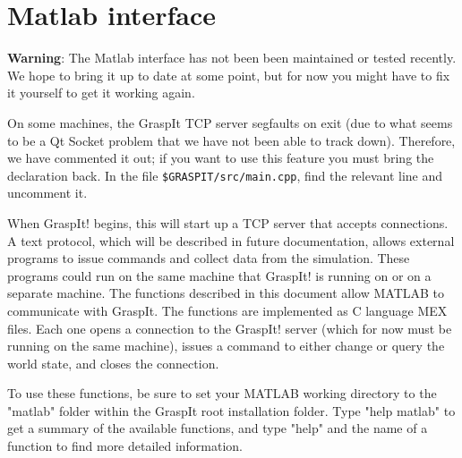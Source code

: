 \section{Matlab interface}

\textbf{Warning}: The Matlab interface has not been been maintained or
tested recently. We hope to bring it up to date at some point, but for
now you might have to fix it yourself to get it working again.

On some machines, the GraspIt TCP server segfaults on exit (due to
what seems to be a Qt Socket problem that we have not been able to
track down). Therefore, we have commented it out; if you want to use
this feature you must bring the declaration back. In the file
\texttt{\$GRASPIT/src/main.cpp}, find the relevant line and uncomment
it.

When GraspIt! begins, this will start up a TCP server that accepts
connections. A text protocol, which will be described in future
documentation, allows external programs to issue commands and collect
data from the simulation. These programs could run on the same machine
that GraspIt! is running on or on a separate machine. The functions
described in this document allow MATLAB to communicate with
GraspIt. The functions are implemented as C language MEX files. Each
one opens a connection to the GraspIt! server (which for now must be
running on the same machine), issues a command to either change or
query the world state, and closes the connection.

To use these functions, be sure to set your MATLAB working directory
to the "matlab" folder within the GraspIt root installation
folder. Type "help matlab" to get a summary of the available
functions, and type "help" and the name of a function to find more
detailed information.

